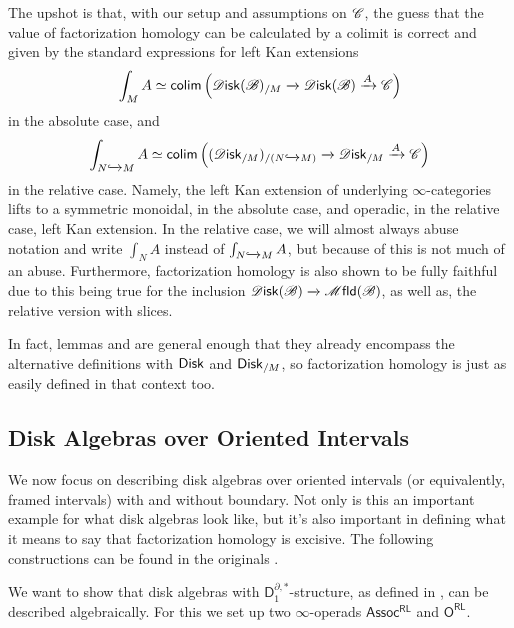 \documentclass[../text]{subfiles}
\begin{document}
The upshot is that, with our setup and assumptions on $\mathscr{C}$, the guess that the value of factorization homology can be calculated by a colimit is correct and given by the standard expressions for left Kan extensions
%
\begin{equation}
    \int_M A \simeq \mathsf{colim} \left(\disk(\bstr)_{/M} \xrightarrow{} \disk(\bstr) \xrightarrow{A} \catC \right)
\end{equation}
%
in the absolute case, and
%
\begin{equation}
    \int_{N \xhookrightarrow{} M} A \simeq \mathsf{colim} \left((\disk_{/M})_{/(N \xhookrightarrow{} M)} \xrightarrow{} \disk_{/M} \xrightarrow{A} \catC \right)
\end{equation}
%
in the relative case. Namely, the left Kan extension of underlying $\infty$-categories lifts to a symmetric monoidal, in the absolute case, and operadic, in the relative case, left Kan extension. In the relative case, we will almost always abuse notation and write $\int_N A$ instead of $\int_{N \xhookrightarrow{} M} A$, but because of  this is not much of an abuse. Furthermore, factorization homology is also shown to be fully faithful due to this being true for the inclusion $\disk(\bstr) \xrightarrow{} \mfld(\bstr)$, as well as, the relative version with slices.

\begin{remark}
    In fact, lemmas \cite[lem.2.16]{aft_fhstrat} and \cite[lem.2.17]{aft_fhstrat} are general enough that they already encompass the alternative definitions with $\disk[r]$ and $\disk[r]_{/M}$, so factorization homology is just as easily defined in that context too.
\end{remark}



\subsection{Disk Algebras over Oriented Intervals}\label{ch:fh_on_intervals}

We now focus on describing disk algebras over oriented intervals (or equivalently, framed intervals) with and without boundary. Not only is this an important example for what disk algebras look like, but it's also important in defining what it means to say that factorization homology is excisive. The following constructions can be found in the originals \cite{af_fhtop,aft_fhstrat}.

We want to show that disk algebras with $\mathsf{D}_1^{\partial, *}$-structure, as defined in , can be described algebraically. For this we set up two $\infty$-operads $\mathsf{Assoc^{RL}}$ and $\mathsf{O^{RL}}$.
\end{document}
